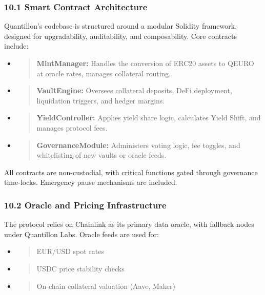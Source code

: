 \hypertarget{smart-contract-architecture}{%
\subsubsection{10.1 Smart Contract
Architecture}\label{smart-contract-architecture}}

Quantillon's codebase is structured around a modular Solidity framework,
designed for upgradability, auditability, and composability. Core
contracts include:

\begin{itemize}
\item
  \begin{quote}
  \textbf{MintManager:} Handles the conversion of ERC20 assets to QEURO
  at oracle rates, manages collateral routing.
  \end{quote}
\item
  \begin{quote}
  \textbf{VaultEngine:} Oversees collateral deposits, DeFi deployment,
  liquidation triggers, and hedger margins.
  \end{quote}
\item
  \begin{quote}
  \textbf{YieldController:} Applies yield share logic, calculates Yield
  Shift, and manages protocol fees.
  \end{quote}
\item
  \begin{quote}
  \textbf{GovernanceModule:} Administers voting logic, fee toggles, and
  whitelisting of new vaults or oracle feeds.
  \end{quote}
\end{itemize}

All contracts are non-custodial, with critical functions gated through
governance time-locks. Emergency pause mechanisms are included.

\hypertarget{oracle-and-pricing-infrastructure}{%
\subsubsection{10.2 Oracle and Pricing
Infrastructure}\label{oracle-and-pricing-infrastructure}}

The protocol relies on Chainlink as its primary data oracle, with
fallback nodes under Quantillon Labs. Oracle feeds are used for:

\begin{itemize}
\item
  \begin{quote}
  EUR/USD spot rates
  \end{quote}
\item
  \begin{quote}
  USDC price stability checks
  \end{quote}
\item
  \begin{quote}
  On-chain collateral valuation (Aave, Maker)
  \end{quote}
\end{itemize}

